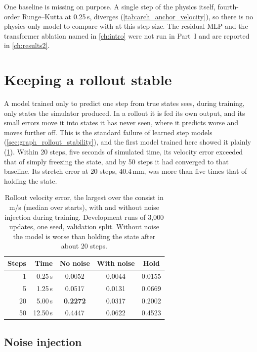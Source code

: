 One baseline is missing on purpose. A single step of the physics itself, fourth-order Runge--Kutta at 0.25\,s, diverges (\cref{tab:arch_anchor_velocity}), so there is no physics-only model to compare with at this step size. The residual MLP and the transformer ablation named in \cref{ch:intro} were not run in Part~I and are reported in \cref{ch:results2}.

\section{Keeping a rollout stable}
\label{sec:train_stability}

A model trained only to predict one step from true states sees, during training, only states the simulator produced. In a rollout it is fed its own output, and its small errors move it into states it has never seen, where it predicts worse and moves further off. This is the standard failure of learned step models (\cref{sec:graph_rollout_stability}), and the first model trained here showed it plainly (\cref{tab:train_noise_effect}). Within 20 steps, five seconds of simulated time, its velocity error exceeded that of simply freezing the state, and by 50 steps it had converged to that baseline. Its stretch error at 20 steps, 40.4\,mm, was more than five times that of holding the state.

\begin{table}[htbp]
    \centering
    \begin{tabular}{rrccc}
        \toprule
        Steps & Time & No noise & With noise & Hold \\
        \midrule
        1  & 0.25\,s  & 0.0052 & 0.0044 & 0.0155 \\
        5  & 1.25\,s  & 0.0517 & 0.0131 & 0.0669 \\
        20 & 5.00\,s  & \textbf{0.2272} & 0.0317 & 0.2002 \\
        50 & 12.50\,s & 0.4447 & 0.0622 & 0.4523 \\
        \bottomrule
    \end{tabular}
    \caption{Rollout velocity error, the largest over the consist in m/s (median over starts), with and without noise injection during training. Development runs of 3,000 updates, one seed, validation split. Without noise the model is worse than holding the state after about 20 steps.}
    \label{tab:train_noise_effect}
\end{table}

\subsection{Noise injection}

